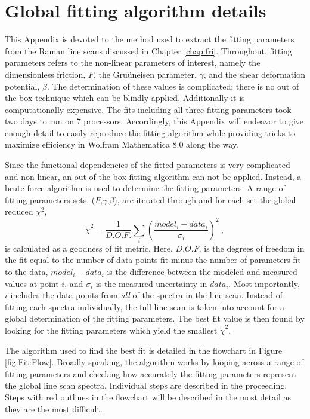 \chapter{Global fitting algorithm details \label{chap:Fit}}
This Appendix is devoted to the method used to extract the fitting parameters from the Raman line scans discussed in Chapter \ref{chap:fri}.
Throughout, fitting parameters refers to the non-linear parameters of interest, namely the dimensionless friction, $F$, the Gru\"uneisen parameter, $\gamma$, and the shear deformation potential, $\beta$.
The determination of these values is complicated; there is no out of the box technique which can be blindly applied.
Additionally it is computationally expensive.
The fits including all three fitting parameters took two days to run on 7 processors.
Accordingly, this Appendix will endeavor to give enough detail to easily reproduce the fitting algorithm while providing tricks to maximize efficiency in Wolfram Mathematica 8.0 along the way.

Since the functional dependencies of the fitted parameters is very complicated and non-linear, an out of the box fitting algorithm can not be applied.
Instead, a brute force algorithm is used to determine the fitting parameters.
A range of fitting parameters sets, ($F$,$\gamma$,$\beta$), are iterated through and for each set the global reduced $\chi^2$, 
\begin{equation*}
	\tilde{\chi}^2=\frac{1}{D.O.F.} \sum_i \left( \frac{model_i-data_i}{\sigma_i} \right)^2 \ ,
\end{equation*}
is calculated as a goodness of fit metric.
Here, $D.O.F.$ is the degrees of freedom in the fit equal to the number of data points fit minus the number of parameters fit to the data, $model_i-data_i$ is the difference between the modeled and measured values at point $i$, and $\sigma_i$ is the measured uncertainty in $data_i$.
Most importantly, $i$ includes the data points from \emph{all} of the spectra in the line scan.
Instead of fitting each spectra individually, the full line scan is taken into account for a global determination of the fitting parameters.
The best fit value is then found by looking for the fitting parameters which yield the smallest $\tilde{\chi}^2$.

The algorithm used to find the best fit is detailed in the flowchart in Figure \ref{fig:Fit:Flow}.
Broadly speaking, the algorithm works by looping across a range of fitting parameters and checking how accurately the fitting parameters represent the global line scan spectra.
Individual steps are described in the proceeding.
Steps with red outlines in the flowchart will be described in the most detail as they are the most difficult.

